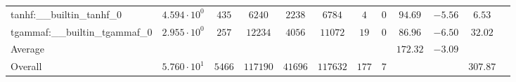 \begin{tabular}{|l|c|c|c|c|c|c|c|c|c|c|c|}
tanhf:\_\_builtin\_tanhf\_0               & $ 4.594 \cdot 10^{0}  $ & $ 435    $ & $ 6240   $ & $ 2238  $ & $ 6784   $ & $ 4   $ & $ 0 $ & $ 94.69       $ & $ -5.56   $ & $ 6.53    $ \\
tgammaf:\_\_builtin\_tgammaf\_0           & $ 2.955 \cdot 10^{0}  $ & $ 257    $ & $ 12234  $ & $ 4056  $ & $ 11072  $ & $ 19  $ & $ 0 $ & $ 86.96       $ & $ -6.50   $ & $ 32.02   $ \\
\hline
Average                                   & $                     $ & $        $ & $        $ & $       $ & $        $ & $     $ & $   $ & $ 172.32      $ & $ -3.09   $ & $         $ \\
\hline
Overall                                   & $ 5.760 \cdot 10^{1}  $ & $ 5466   $ & $ 117190 $ & $ 41696 $ & $ 117632 $ & $ 177 $ & $ 7 $ & $             $ & $         $ & $ 307.87  $ \\
\hline
\end{tabular}
